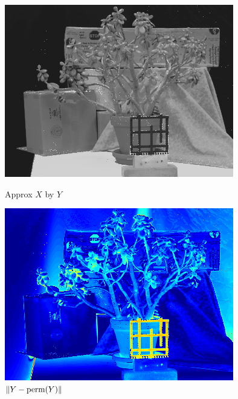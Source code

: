 \documentclass{beamer}
\begin{document}
\begin{frame}
\begin{figure}[ht]
\begin{minipage}[b]{0.32\linewidth}
      \centering
      \includegraphics[width=\textwidth]{./Images/ChangeDetect/JadePlant/permY.png}
      \caption{Approx $X$ by $Y$}
    \end{minipage}
    \hfill
    \begin{minipage}[b]{0.32\linewidth}
      \centering
      \includegraphics[width=\textwidth]{./Images/ChangeDetect/JadePlant/ChangesYtoX.png}
      \caption{$\left\lVert Y-\text{perm}(Y)\right\rVert$}
    \end{minipage}
  \end{figure}  
\end{frame}
\end{document}
